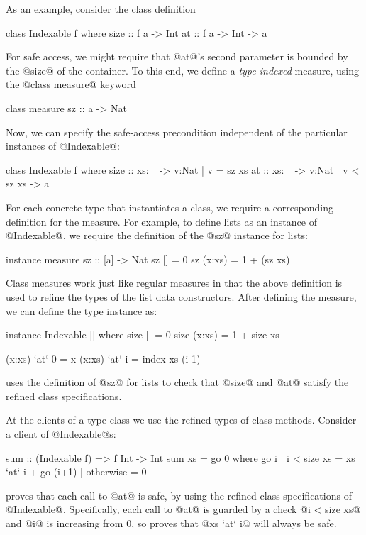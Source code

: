 As an example, consider the class definition
%
\begin{code}
  class Indexable f where
    size :: f a -> Int
    at   :: f a -> Int -> a
\end{code}
%
For safe access, we might require that @at@'s second 
parameter is bounded by the @size@ of the container.
To this end, we define a \emph{type-indexed} 
measure, using the @class measure@ keyword
%
\begin{code}
  class measure sz :: a -> Nat
\end{code}
%
Now, we can specify the safe-access precondition  
independent of the particular instances of @Indexable@:
%
\begin{code}
  class Indexable f where
    size :: xs:_ -> {v:Nat | v = sz xs}
    at   :: xs:_ -> {v:Nat | v < sz xs} -> a
\end{code}

For each concrete type that instantiates a class, we require 
a corresponding definition for the measure. 
For example, to define lists as an instance of @Indexable@, 
we require the definition of the @sz@ instance for lists:
%
\begin{code}
  instance measure sz :: [a] -> Nat
    sz []     = 0
    sz (x:xs) = 1 + (sz xs)
\end{code}
%
Class measures work just like regular measures in that the above 
definition is used to refine the types of the list data constructors.
After defining the measure, we can define the type instance as:
%
\begin{code}
  instance Indexable [] where
    size []        = 0
    size (x:xs)    = 1 + size xs

    (x:xs) `at` 0  = x
    (x:xs) `at` i  = index xs (i-1)
\end{code}
%
\toolname uses the definition of @sz@ for lists to check that @size@ 
and @at@ satisfy the refined class specifications. 

At the clients of a type-class we use the refined 
types of class methods. Consider a client of @Indexable@s:
%
\begin{code}
  sum :: (Indexable f) => f Int -> Int
  sum xs = go 0 
    where
      go i | i < size xs = xs `at` i + go (i+1)
           | otherwise   = 0
\end{code}
%
\toolname proves that each call to @at@ is safe, by using the refined
class specifications of @Indexable@. 
Specifically, each call to @at@ is guarded by a check @i < size xs@
and @i@ is  increasing 
from 0, so \toolname proves that @xs `at` i@ will always be safe.

